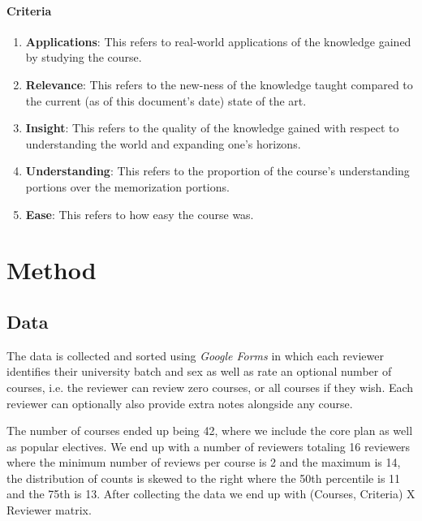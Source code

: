 \documentclass[12pt,a4paper]{article}
\begin{document}
\paragraph{Criteria}
\begin{enumerate}
    \item \textbf{Applications}: This refers to real-world applications of the knowledge gained by studying the course.
    \item \textbf{Relevance}: This refers to the new-ness of the knowledge taught compared to the current (as of this document's date) state of the art.
    \item \textbf{Insight}: This refers to the quality of the knowledge gained with respect to understanding the world and expanding one's horizons.
    \item \textbf{Understanding}: This refers to the proportion of the course's understanding portions over the memorization portions. 
    \item \textbf{Ease}: This refers to how easy the course was.
\end{enumerate}

\section{Method}
\subsection{Data}
The data is collected and sorted using \emph{Google Forms} in which each reviewer identifies their university batch and sex as well as rate an optional number of courses, i.e. the reviewer can review zero courses, or all courses if they wish. Each reviewer can optionally also provide extra notes alongside any course. 

The number of courses ended up being 42, where we include the core plan as well as popular electives. We end up with a number of reviewers totaling 16 reviewers where the minimum number of reviews per course is 2 and the maximum is 14, the distribution of counts is skewed to the right where the 50th percentile is 11 and the 75th is 13. After collecting the data we end up with (Courses, Criteria) X Reviewer matrix.
\end{document}

